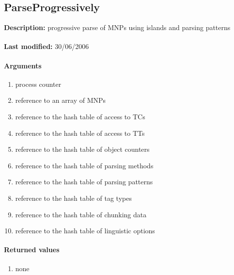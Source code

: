 \subsection{ParseProgressively}
\textbf{Description:} progressive parse of MNPs using islands and parsing patterns\\
\\\textbf{Last modified:} 30/06/2006

\paragraph{Arguments}
\begin{enumerate}
\item process counter
\item reference to an array of MNPs
\item reference to the hash table of access to TCs
\item reference to the hash table of access to TTs
\item reference to the hash table of object counters
\item reference to the hash table of parsing methods
\item reference to the hash table of parsing patterns
\item reference to the hash table of tag types
\item reference to the hash table of chunking data
\item reference to the hash table of linguistic options
\end{enumerate}

\paragraph{Returned values}
\begin{enumerate}
\item none
\end{enumerate}

